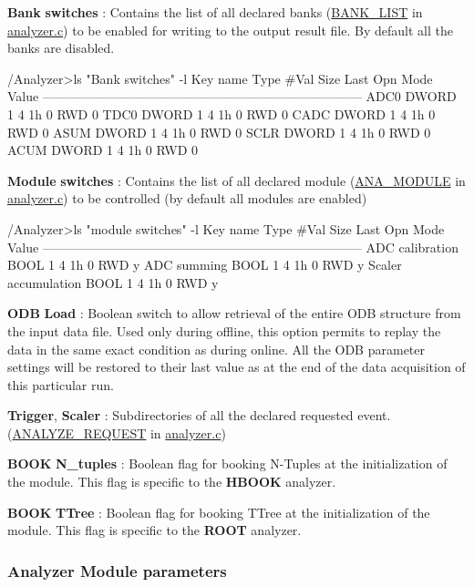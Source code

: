 \begin{DoxyItemize}
\item {\bfseries Bank} {\bfseries switches} : Contains the list of all declared banks (\hyperlink{structBANK__LIST}{BANK\_\-LIST} in \hyperlink{analyzer_8c}{analyzer.c}) to be enabled for writing to the output result file. By default all the banks are disabled. 
\begin{DoxyCode}
 /Analyzer>ls "Bank switches" -l
 Key name                        Type    #Val  Size  Last Opn Mode Value
 ---------------------------------------------------------------------------
 ADC0                            DWORD   1     4     1h   0   RWD  0
 TDC0                            DWORD   1     4     1h   0   RWD  0
 CADC                            DWORD   1     4     1h   0   RWD  0
 ASUM                            DWORD   1     4     1h   0   RWD  0
 SCLR                            DWORD   1     4     1h   0   RWD  0
 ACUM                            DWORD   1     4     1h   0   RWD  0
\end{DoxyCode}

\item {\bfseries Module} {\bfseries switches} : Contains the list of all declared module (\hyperlink{structANA__MODULE}{ANA\_\-MODULE} in \hyperlink{analyzer_8c}{analyzer.c}) to be controlled (by default all modules are enabled) 
\begin{DoxyCode}
 /Analyzer>ls "module switches" -l
 Key name                        Type    #Val  Size  Last Opn Mode Value
 ---------------------------------------------------------------------------
 ADC calibration                 BOOL    1     4     1h   0   RWD  y
 ADC summing                     BOOL    1     4     1h   0   RWD  y
 Scaler accumulation             BOOL    1     4     1h   0   RWD  y
\end{DoxyCode}

\item {\bfseries ODB} {\bfseries Load} : Boolean switch to allow retrieval of the entire ODB structure from the input data file. Used only during offline, this option permits to replay the data in the same exact condition as during online. All the ODB parameter settings will be restored to their last value as at the end of the data acquisition of this particular run.
\item {\bfseries Trigger}, {\bfseries Scaler} : Subdirectories of all the declared requested event. (\hyperlink{structANALYZE__REQUEST}{ANALYZE\_\-REQUEST} in \hyperlink{analyzer_8c}{analyzer.c})
\item {\bfseries BOOK} {\bfseries N\_\-tuples} : Boolean flag for booking N-\/Tuples at the initialization of the module. This flag is specific to the {\bfseries HBOOK} analyzer.
\item {\bfseries BOOK} {\bfseries TTree} : Boolean flag for booking TTree at the initialization of the module. This flag is specific to the {\bfseries ROOT} analyzer.
\end{DoxyItemize}\hypertarget{DataAnalysis_Analyzer_module_parameters}{}\subsubsection{Analyzer Module parameters}\label{DataAnalysis_Analyzer_module_parameters}
